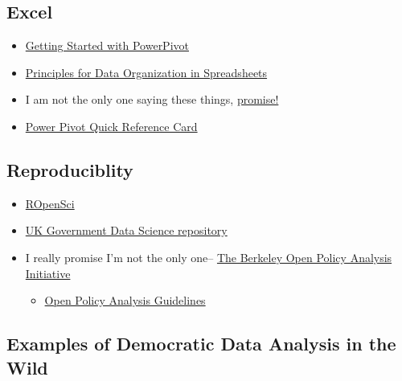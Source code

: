 \documentclass[]{book}
\providecommand{\tightlist}{%
  \setlength{\itemsep}{0pt}\setlength{\parskip}{0pt}}
\begin{document}
\hypertarget{excel}{%
\subsection{Excel}\label{excel}}

\begin{itemize}
\tightlist
\item
  \href{https://support.office.com/en-us/article/get-started-with-power-pivot-in-microsoft-excel-fdfcf944-7876-424a-8437-1a6c1043a80b}{Getting Started with PowerPivot}
\item
  \href{https://www.tandfonline.com/doi/full/10.1080/00031305.2017.1375989}{Principles for Data Organization in Spreadsheets}
\item
  I am not the only one saying these things, \href{https://towardsdatascience.com/microsoft-excel-in-the-era-of-big-data-401e67ca28a5}{promise!}
\item
  \href{https://powerpivotpro.com/2015/10/giving-back-steal-this-reference-card/\#downloads}{Power Pivot Quick Reference Card}
\end{itemize}

\hypertarget{reproduciblity}{%
\subsection{Reproduciblity}\label{reproduciblity}}

\begin{itemize}
\tightlist
\item
  \href{https://ropensci.org}{ROpenSci}
\item
  \href{https://github.com/ukgovdatascience}{UK Government Data Science repository}
\item
  I really promise I'm not the only one-- \href{https://www.bitss.org/opa/}{The Berkeley Open Policy Analysis Initiative}

  \begin{itemize}
  \tightlist
  \item
    \href{https://www.bitss.org/wp-content/uploads/2019/03/OPA-Guidelines.pdf}{Open Policy Analysis Guidelines}
  \end{itemize}
\end{itemize}

\hypertarget{examples-of-democratic-data-analysis-in-the-wild}{%
\subsection{Examples of Democratic Data Analysis in the Wild}\label{examples-of-democratic-data-analysis-in-the-wild}}
\end{document}

